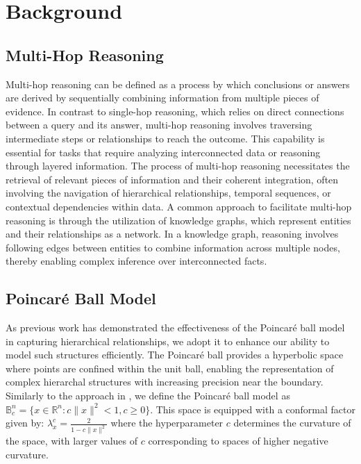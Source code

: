\documentclass[11pt]{article}
\begin{document}
\section{Background}

\subsection{Multi-Hop Reasoning}
Multi-hop reasoning can be defined as a process by which conclusions or answers are derived by sequentially combining information from multiple pieces of evidence. In contrast to single-hop reasoning, which relies on direct connections between a query and its answer, multi-hop reasoning involves traversing intermediate steps or relationships to reach the outcome. This capability is essential for tasks that require analyzing interconnected data or reasoning through layered information.
The process of multi-hop reasoning necessitates the retrieval of relevant pieces of information and their coherent integration, often involving the navigation of hierarchical relationships, temporal sequences, or contextual dependencies within data. A common approach to facilitate multi-hop reasoning is through the utilization of knowledge graphs, which represent entities and their relationships as a network. In a knowledge graph, reasoning involves following edges between entities to combine information across multiple nodes, thereby enabling complex inference over interconnected facts.

\subsection{Poincaré Ball Model}
As previous work has demonstrated the effectiveness of the Poincaré ball model \cite{nickel2017poincare, ganea2018hyperbolicneuralnetworks, chami2020lowdimensionalhyperbolicknowledgegraph, khrulkov2020hyperbolicimageembeddings, chen-etal-2024-hyperbolic} in capturing hierarchical relationships, we adopt it to enhance our ability to model such structures efficiently. The Poincaré ball provides a hyperbolic space where points are confined within the unit ball, enabling the representation of complex hierarchal structures with increasing precision near the boundary.
Similarly to the approach in \citet{nickel2017poincare}, we define the Poincaré ball model as $\mathbb{B}_c^n = \{x \in \mathbb{R}^n : c\| x \|^2 < 1, c\geq 0\}$. This space is equipped with a conformal factor given by: $\lambda_x^c = \frac{2}{1 - c\| x \|^2}$ where the hyperparameter 
$c$ determines the curvature of the space, with larger values of 
$c$ corresponding to spaces of higher negative curvature.
\end{document}
